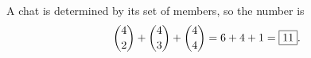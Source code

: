 A chat is determined by its set of members, so the number is
\[\dbinom42+\dbinom43+\dbinom44=6+4+1=\boxed{11}.\]
